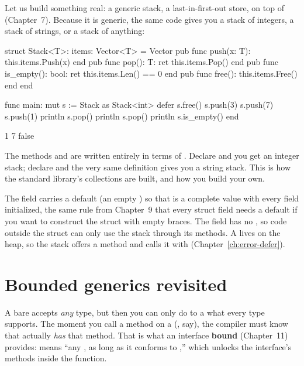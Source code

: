 Let us build something real: a generic stack, a last-in-first-out store, on top of
 (Chapter~7). Because it is generic, the same code gives you a stack of
integers, a stack of strings, or a stack of anything:

\begin{salamen}
struct Stack<T>:
    items: Vector<T> = Vector {}
    pub func push(x: T):
        this.items.Push(x)
    end
    pub func pop(): T:
        ret this.items.Pop()
    end
    pub func is_empty(): bool:
        ret this.items.Len() == 0
    end
    pub func free():
        this.items.Free()
    end
end

func main:
    mut s := Stack {} as Stack<int>
    defer s.free()
    s.push(3)
    s.push(7)
    s.push(1)
    println s.pop()
    println s.pop()
    println s.is_empty()
end
\end{salamen}

\begin{progout}
1
7
false
\end{progout}

The methods  and  are written entirely in terms of .
Declare  and you get an integer stack; declare 
and the very same definition gives you a string stack. This is how the standard
library's collections are built, and how you build your own.

\begin{note}
The  field carries a default (an empty ) so that
 is a complete value with every field initialized, the same
rule from Chapter~9 that every struct field needs a default if you want to
construct the struct with empty braces. The field has no , so code
outside the struct can only use the stack through its methods. A 
lives on the heap, so the stack offers a  method and 
calls it with  (Chapter~\ref{ch:error-defer}).
\end{note}

\section{Bounded generics revisited}

A bare  accepts \emph{any} type, but then you can only do to a 
what every type supports. The moment you call a method on a 
(, say), the compiler must know that  actually \emph{has}
that method. That is what an interface \textbf{bound} (Chapter~11) provides:
 means ``any , as long as it conforms to ,''
which unlocks the interface's methods inside the function.

